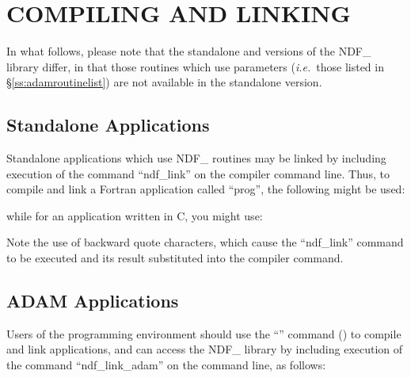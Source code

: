 \documentclass[twoside,11pt,nolof]{starlink}
\providecommand{\st}[1]{{\emph{#1}}}
\begin{document}
\section{\label{ss:compilingandlinking}COMPILING AND LINKING}

In what follows, please note that the standalone and
 versions of
the NDF\_ library differ, in that those routines which use parameters
(\st{i.e.}\ those listed in \S\ref{ss:adamroutinelist}) are not
available in the standalone version.

\subsection{Standalone Applications}
Standalone applications which use NDF\_ routines may be linked by
including execution of the command ``ndf\_link'' on the compiler
command line. Thus, to compile and link a Fortran application called
``prog'', the following might be used:

\small
\begin{terminalv}
\end{terminalv}
\normalsize

while for an application written in C, you might use:

\small
\begin{terminalv}
\end{terminalv}
\normalsize

Note the use of backward quote characters, which cause the
``ndf\_link'' command to be executed and its result substituted into
the compiler command.

\subsection{\label{ss:buildingadamapplications}ADAM Applications}
Users of the  programming environment
 should use
the ``'' command
() to compile and link applications, and can
access
the NDF\_ library by including execution of the command
``ndf\_link\_adam'' on the command line, as follows:

\small
\begin{terminalv}
\end{terminalv}
\normalsize
\end{document}
